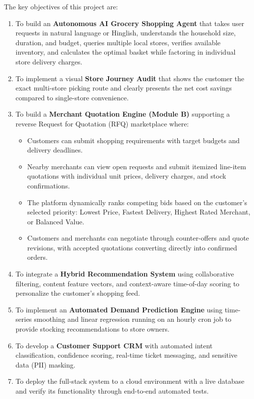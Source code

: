 The key objectives of this project are:

\begin{enumerate}
    \item To build an \textbf{Autonomous AI Grocery Shopping Agent} that takes user requests in natural language or Hinglish, understands the household size, duration, and budget, queries multiple local stores, verifies available inventory, and calculates the optimal basket while factoring in individual store delivery charges.
    \item To implement a visual \textbf{Store Journey Audit} that shows the customer the exact multi-store picking route and clearly presents the net cost savings compared to single-store convenience.
    \item To build a \textbf{Merchant Quotation Engine (Module B)} supporting a reverse Request for Quotation (RFQ) marketplace where:
    \begin{itemize}
        \item Customers can submit shopping requirements with target budgets and delivery deadlines.
        \item Nearby merchants can view open requests and submit itemized line-item quotations with individual unit prices, delivery charges, and stock confirmations.
        \item The platform dynamically ranks competing bids based on the customer's selected priority: Lowest Price, Fastest Delivery, Highest Rated Merchant, or Balanced Value.
        \item Customers and merchants can negotiate through counter-offers and quote revisions, with accepted quotations converting directly into confirmed orders.
    \end{itemize}
    \item To integrate a \textbf{Hybrid Recommendation System} using collaborative filtering, content feature vectors, and context-aware time-of-day scoring to personalize the customer's shopping feed.
    \item To implement an \textbf{Automated Demand Prediction Engine} using time-series smoothing and linear regression running on an hourly cron job to provide stocking recommendations to store owners.
    \item To develop a \textbf{Customer Support CRM} with automated intent classification, confidence scoring, real-time ticket messaging, and sensitive data (PII) masking.
    \item To deploy the full-stack system to a cloud environment with a live database and verify its functionality through end-to-end automated tests.
\end{enumerate}

